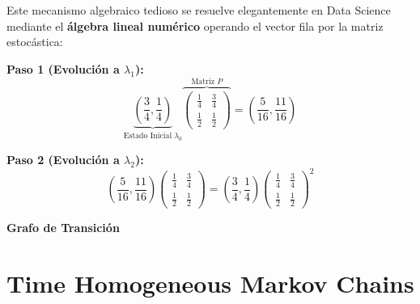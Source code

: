 \begin{ejemplo}
\vspace{0.4cm}

\noindent Este mecanismo algebraico tedioso se resuelve elegantemente en Data Science mediante el \textbf{álgebra lineal numérico} operando el vector fila por la matriz estocástica:

\vspace{0.3cm}
\noindent
\begin{minipage}{0.55\textwidth}
    \textbf{Paso 1 (Evolución a $\lambda_1$):}
    \[ \underbrace{\left( \frac{3}{4}, \frac{1}{4} \right)}_{\text{Estado Inicial $\lambda_0$}} \overbrace{\begin{pmatrix} \frac{1}{4} & \frac{3}{4} \\ \frac{1}{2} & \frac{1}{2} \end{pmatrix}}^{\text{{Matriz $P$}}} = \left( \frac{5}{16}, \frac{11}{16} \right) \]
    
    \textbf{Paso 2 (Evolución a $\lambda_2$):}
    \[ \left( \frac{5}{16}, \frac{11}{16} \right) \begin{pmatrix} \frac{1}{4} & \frac{3}{4} \\ \frac{1}{2} & \frac{1}{2} \end{pmatrix} = \left( \frac{3}{4}, \frac{1}{4} \right) \begin{pmatrix} \frac{1}{4} & \frac{3}{4} \\ \frac{1}{2} & \frac{1}{2} \end{pmatrix}^2 \]
\end{minipage}
\begin{minipage}{0.4\textwidth}
    \centering
    \textbf{Grafo de Transición} \\
    \vspace{0.2cm}
\end{minipage}
\end{ejemplo}

\section{Time Homogeneous Markov Chains}

